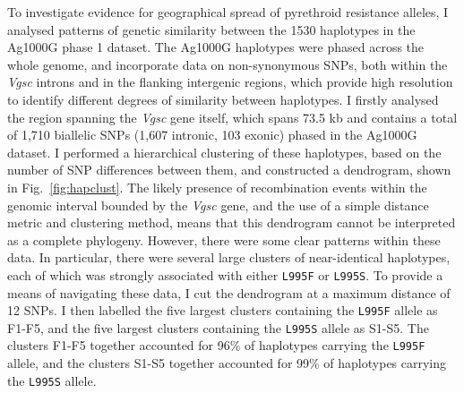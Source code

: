 \documentclass[a4paper,11pt,abstracton,hidelinks]{scrartcl}
\begin{document}
To investigate evidence for geographical spread of pyrethroid resistance alleles, I analysed patterns of genetic similarity between the 1530 haplotypes in the Ag1000G phase 1 dataset.
%
The Ag1000G haplotypes were phased across the whole genome, and incorporate data on non-synonymous SNPs, both within the \textit{Vgsc} introns and in the flanking intergenic regions, which provide high resolution to identify different degrees of similarity between haplotypes.
%
I firstly analysed the region spanning the \textit{Vgsc} gene itself, which spans 73.5 kb and contains a total of 1,710 biallelic SNPs (1,607 intronic, 103 exonic) phased in the Ag1000G dataset.
%
I performed a hierarchical clustering of these haplotypes, based on the number of SNP differences between them, and constructed a dendrogram, shown in Fig.~\ref{fig:hapclust}.
%
The likely presence of recombination events within the genomic interval bounded by the \textit{Vgsc} gene, and the use of a simple distance metric and clustering method, means that this dendrogram cannot be interpreted as a complete phylogeny.
%
However, there were some clear patterns within these data.
%
In particular, there were several large clusters of near-identical haplotypes, each of which was strongly associated with either \texttt{L995F} or \texttt{L995S}.
%
To provide a means of navigating these data, I cut the dendrogram at a maximum distance of 12 SNPs.
%
I then labelled the five largest clusters containing the \texttt{L995F} allele as F1-F5, and the five largest clusters containing the \texttt{L995S} allele as S1-S5.
%
The clusters F1-F5 together accounted for 96\% of haplotypes carrying the \texttt{L995F} allele, and the clusters S1-S5 together accounted for 99\% of haplotypes carrying the \texttt{L995S} allele.
\end{document}
